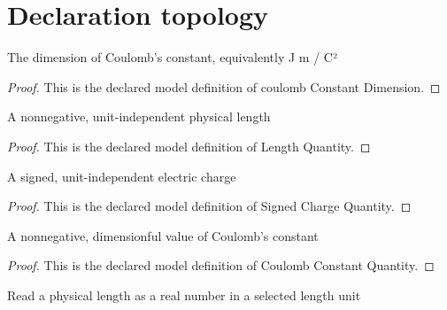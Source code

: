 \section{Declaration topology}
\begin{definition}
  \label{def:physics:phyx-mini-0636:phyxminiproblems-problemphyxmini0636-coulombconstantdimension}
  The dimension of Coulomb's constant, equivalently J m / C²
\end{definition}
\begin{proof}
  This is the declared model definition of coulomb Constant Dimension.
\end{proof}
\begin{definition}
  \label{def:physics:phyx-mini-0636:phyxminiproblems-problemphyxmini0636-lengthquantity}
  A nonnegative, unit-independent physical length
\end{definition}
\begin{proof}
  This is the declared model definition of Length Quantity.
\end{proof}
\begin{definition}
  \label{def:physics:phyx-mini-0636:phyxminiproblems-problemphyxmini0636-signedchargequantity}
  A signed, unit-independent electric charge
\end{definition}
\begin{proof}
  This is the declared model definition of Signed Charge Quantity.
\end{proof}
\begin{definition}
  \label{def:physics:phyx-mini-0636:phyxminiproblems-problemphyxmini0636-coulombconstantquantity}
  A nonnegative, dimensionful value of Coulomb's constant
\end{definition}
\begin{proof}
  This is the declared model definition of Coulomb Constant Quantity.
\end{proof}
\begin{definition}
  \label{def:physics:phyx-mini-0636:phyxminiproblems-problemphyxmini0636-lengthreadout}
  Read a physical length as a real number in a selected length unit
\end{definition}

